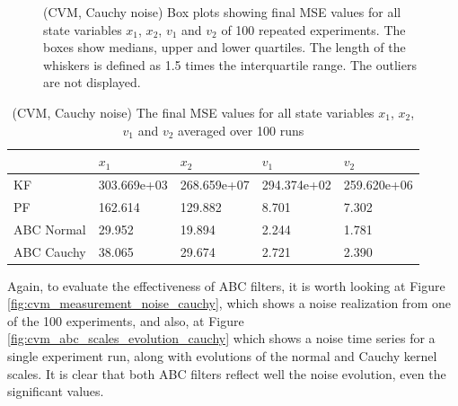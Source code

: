 \begin{figure}[!ht]
\centering
\caption{(CVM, Cauchy noise)  Box plots showing final MSE values for all state variables $x_1$, $x_2$, $v_1$ and $v_2$ of 100 repeated experiments. The boxes show medians, upper and lower quartiles. The length of the whiskers is defined as 1.5 times the interquartile range. The outliers are not displayed.}
\label{fig:cvm_mse_boxplot_cauchy}
\end{figure}

\begin{table}[h!]
\centering
\begin{tabular}{ |p{2cm}|p{2cm}|p{2cm}|p{2cm}|p{2cm}|}
 \hline 
  & $x_1$ & $x_2$ & $v_1$ & $v_2$ \\
 \hline \hline
 KF & 303.669e+03 & 268.659e+07 & 294.374e+02 & 259.620e+06  \\
 PF & 162.614 & 129.882 & 8.701 & 7.302 \\
 ABC Normal & 29.952 & 19.894 & 2.244 & 1.781 \\
 ABC Cauchy & 38.065 & 29.674 & 2.721 & 2.390 \\
 \hline
\end{tabular}
\caption{(CVM, Cauchy noise) The final MSE values for all state variables $x_1$, $x_2$, $v_1$ and $v_2$ averaged over 100 runs}
\label{table:cvm_mse_cauchy}
\end{table}


Again, to evaluate the effectiveness of ABC filters, it is worth looking at Figure \ref{fig:cvm_measurement_noise_cauchy}, which shows a noise realization from one of the 100 experiments, and also, at  Figure \ref{fig:cvm_abc_scales_evolution_cauchy} which shows a noise time series for a single experiment run, along with evolutions of the normal and Cauchy kernel scales. It is clear that both ABC filters reflect well the noise evolution, even the significant values.

